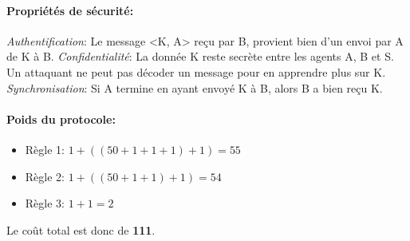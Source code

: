 \documentclass{article}
\begin{document}
\paragraph{Propriétés de sécurité: }
\emph{Authentification}: Le message <K, A> reçu par B, provient bien d'un envoi par A de K à B.
\emph{Confidentialité}: La donnée K reste secrète entre les agents A, B et S. Un attaquant ne peut pas décoder un message pour en apprendre plus sur K.
\emph{Synchronisation}: Si A termine en ayant envoyé K à B, alors B a bien reçu K.

\paragraph{Poids du protocole: }
\begin{itemize}
    \item Règle 1: $1 + ((50 + 1 + 1 + 1) + 1) = 55$
    \item Règle 2: $1 + ((50 + 1 + 1) + 1) = 54$
    \item Règle 3: $1 + 1 = 2$
\end{itemize}
Le coût total est donc de \textbf{111}.
\end{document}

